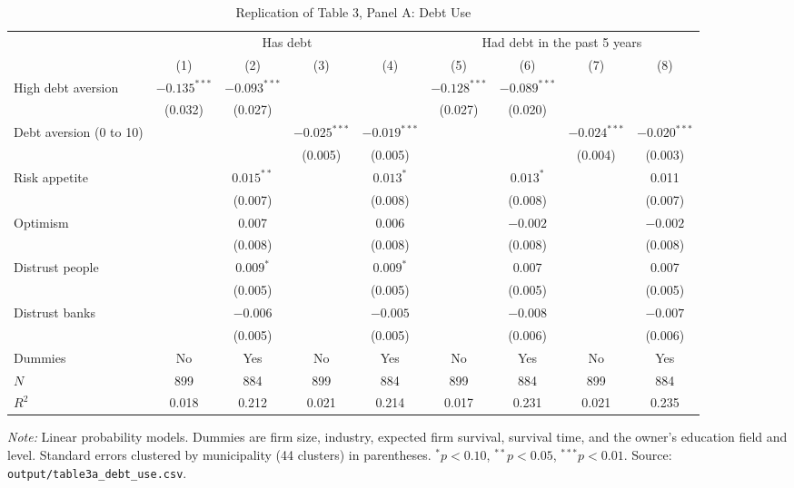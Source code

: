 \documentclass[preprint,letterpaper,11pt,authoryear]{elsarticle}
\newenvironment{tablenotes}{\par\vspace{3pt}\begin{minipage}{0.95\linewidth}\footnotesize\textit{Note:} }{\end{minipage}}
\begin{document}
\begin{table}[!htbp]
\centering\footnotesize\setlength{\tabcolsep}{2.5pt}
\caption{Replication of Table 3, Panel A: Debt Use}
\label{tab:t3}
\begin{tabular}{lcccccccc}
\toprule
 & \multicolumn{4}{c}{Has debt} & \multicolumn{4}{c}{Had debt in the past 5 years} \\
\cmidrule(lr){2-5}\cmidrule(lr){6-9}
 & (1) & (2) & (3) & (4) & (5) & (6) & (7) & (8) \\
\midrule
High debt aversion & $-0.135^{***}$ & $-0.093^{***}$ & & & $-0.128^{***}$ & $-0.089^{***}$ & & \\
 & (0.032) & (0.027) & & & (0.027) & (0.020) & & \\
Debt aversion (0 to 10) & & & $-0.025^{***}$ & $-0.019^{***}$ & & & $-0.024^{***}$ & $-0.020^{***}$ \\
 & & & (0.005) & (0.005) & & & (0.004) & (0.003) \\
Risk appetite & & $0.015^{**}$ & & $0.013^{*}$ & & $0.013^{*}$ & & 0.011 \\
 & & (0.007) & & (0.008) & & (0.008) & & (0.007) \\
Optimism & & 0.007 & & 0.006 & & $-0.002$ & & $-0.002$ \\
 & & (0.008) & & (0.008) & & (0.008) & & (0.008) \\
Distrust people & & $0.009^{*}$ & & $0.009^{*}$ & & 0.007 & & 0.007 \\
 & & (0.005) & & (0.005) & & (0.005) & & (0.005) \\
Distrust banks & & $-0.006$ & & $-0.005$ & & $-0.008$ & & $-0.007$ \\
 & & (0.005) & & (0.005) & & (0.006) & & (0.006) \\
\midrule
Dummies & No & Yes & No & Yes & No & Yes & No & Yes \\
$N$ & 899 & 884 & 899 & 884 & 899 & 884 & 899 & 884 \\
$R^2$ & 0.018 & 0.212 & 0.021 & 0.214 & 0.017 & 0.231 & 0.021 & 0.235 \\
\bottomrule
\end{tabular}
\begin{tablenotes}
Linear probability models. Dummies are firm size, industry, expected firm survival, survival time, and the owner's education field and level. Standard errors clustered by municipality (44 clusters) in parentheses. $^{*}p<0.10$, $^{**}p<0.05$, $^{***}p<0.01$. Source: \texttt{output/table3a\_debt\_use.csv}.
\end{tablenotes}
\end{table}
\end{document}
